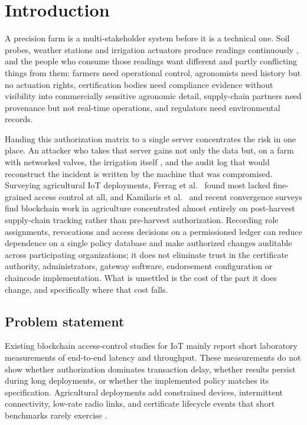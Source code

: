 \documentclass[a4paper,fleqn]{cas-dc}
\begin{document}
\section{Introduction}
\label{sec:intro}

A precision farm is a multi-stakeholder system before it is a technical one.
Soil probes, weather stations and irrigation actuators produce readings
continuously \cite{zhang2002precision}, and the people who consume those
readings want different and partly conflicting things from them: farmers
need operational control, agronomists need history but no actuation rights,
certification bodies need compliance evidence without visibility into
commercially sensitive agronomic detail, supply-chain partners need
provenance but not real-time operations, and regulators need environmental
records.

Handing this authorization matrix to a single server concentrates the risk
in one place. An attacker who takes that server gains not only the data but,
on a farm with networked valves, the irrigation itself
\cite{benedict2021decentralized}, and the audit log that would reconstruct
the incident is written by the machine that was compromised. Surveying
agricultural IoT deployments, Ferrag et al.\ \cite{ferrag2020security} found
most lacked fine-grained access control at all, and Kamilaris et
al.\ \cite{kamilaris2019rise} and recent convergence surveys
\cite{rustemi2025synergizing} find blockchain work in agriculture
concentrated almost entirely on post-harvest supply-chain tracking rather
than pre-harvest authorization. Recording role assignments, revocations
and access decisions on a permissioned ledger can reduce dependence on a
single policy database and make authorized changes auditable across
participating organizations; it does not eliminate trust in the
certificate authority, administrators, gateway software, endorsement
configuration or chaincode implementation. What is unsettled is the
cost of the part it does change, and specifically where that cost falls.

\subsection{Problem statement}
\label{subsec:problem}

Existing blockchain access-control studies for IoT mainly report short
laboratory measurements of end-to-end latency and throughput. These
measurements do not show whether authorization dominates transaction delay,
whether results persist during long deployments, or whether the implemented
policy matches its specification. Agricultural deployments add constrained
devices, intermittent connectivity, low-rate radio links, and certificate
lifecycle events that short benchmarks rarely exercise
\cite{abang2024latency,ferrag2020security,rustemi2025synergizing}.
\end{document}
